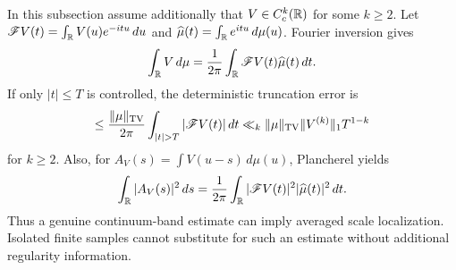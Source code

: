 In this subsection assume additionally that
$V\in C_c^k(\mathbb R)$ for some $k\geq2$.
Let
\(
 \mathscr F V(t)=\int_\mathbb R V(u)e^{-itu}\,du
\)
and
\(
 \widehat\mu(t)=\int_\mathbb R e^{itu}\,d\mu(u)
\).
Fourier inversion gives
\begin{equation}\label{eq:continuum-band-inversion}
 \int_\mathbb R V\,d\mu
 =\frac1{2\pi}\int_\mathbb R \mathscr F V(t)\widehat\mu(t)\,dt.
\end{equation}
If only $|t|\leq T$ is controlled, the deterministic truncation error is
\begin{equation}\label{eq:continuum-band-error}
 \leq\frac{\|\mu\|_{\TV}}{2\pi}
 \int_{|t|>T}|\mathscr F V(t)|\,dt
 \ll_k\|\mu\|_{\TV}\|V^{(k)}\|_1T^{1-k}
\end{equation}
for $k\geq2$.  Also, for
$A_V(s)=\int V(u-s)\,d\mu(u)$, Plancherel yields
\begin{equation}\label{eq:scale-center-Plancherel}
 \int_\mathbb R|A_V(s)|^2\,ds
 =\frac1{2\pi}\int_\mathbb R
 |\mathscr F V(t)|^2|\widehat\mu(t)|^2\,dt.
\end{equation}
Thus a genuine continuum-band estimate can imply averaged scale
localization.  Isolated finite samples cannot substitute for such an
estimate without additional regularity information.
